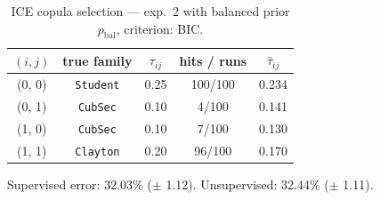 \begin{table}[htbp]
  \centering
  \caption{ICE copula selection — exp.\ 2 with balanced prior $p_{\text{bal}}$, criterion: BIC.}
  \label{tab:exp3-exp2_bal_p__bic}
  \begin{tabular}{ccccc}
    \toprule
    $(i, j)$ & true family & $\tau_{ij}$ & hits / runs & $\hat\tau_{ij}$ \\
    \midrule
    (0, 0) & \texttt{Student} & 0.25 & 100/100 & 0.234 \\
    (0, 1) & \texttt{CubSec} & 0.10 & 4/100 & 0.141 \\
    (1, 0) & \texttt{CubSec} & 0.10 & 7/100 & 0.130 \\
    (1, 1) & \texttt{Clayton} & 0.20 & 96/100 & 0.170 \\
    \bottomrule
  \end{tabular}
  \par\smallskip Supervised error: 32.03\% ($\pm$ 1.12). Unsupervised: 32.44\% ($\pm$ 1.11).
\end{table}
